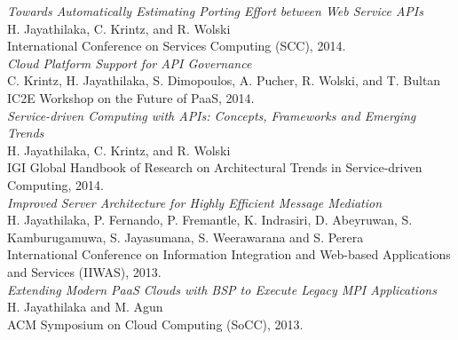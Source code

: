 \begin{vitae}
\textit{Towards Automatically Estimating Porting Effort between Web Service APIs} \\
H. Jayathilaka, C. Krintz, and R. Wolski \\
International Conference on Services Computing (SCC), 2014. \\

\textit{Cloud Platform Support for API Governance} \\
C. Krintz, H. Jayathilaka, S. Dimopoulos, A. Pucher, R. Wolski, and T. Bultan \\
IC2E Workshop on the Future of PaaS, 2014. \\

\textit{Service-driven Computing with APIs: Concepts, Frameworks and Emerging Trends} \\
H. Jayathilaka, C. Krintz, and R. Wolski \\
IGI Global Handbook of Research on Architectural Trends in Service-driven Computing, 2014. \\

\textit{Improved Server Architecture for Highly Efficient Message Mediation} \\
H. Jayathilaka, P. Fernando, P. Fremantle, K. Indrasiri, D. Abeyruwan, S. Kamburugamuwa, S. Jayasumana, S. Weerawarana and S. Perera \\
International Conference on Information Integration and Web-based Applications and Services (IIWAS), 2013. \\

\textit{Extending Modern PaaS Clouds with BSP to Execute Legacy MPI Applications} \\
H. Jayathilaka and M. Agun \\
ACM Symposium on Cloud Computing (SoCC), 2013. \\

\end{vitae}